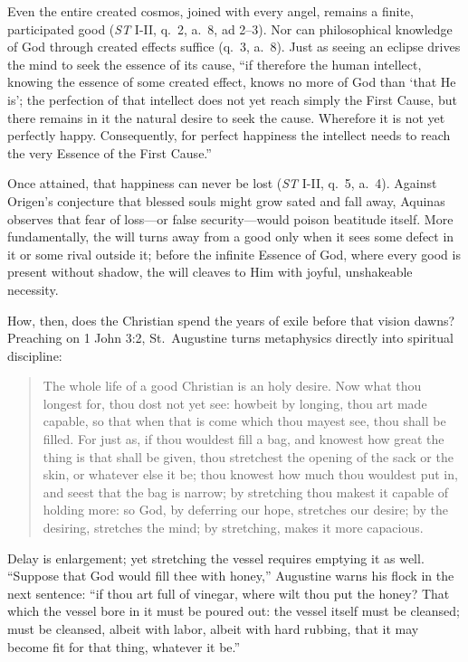 Even the entire created cosmos, joined with every angel, remains a finite, participated good (\textit{ST} I-II, q.\ 2, a.\ 8, ad 2--3). Nor can philosophical knowledge of God through created effects suffice (q.\ 3, a.\ 8). Just as seeing an eclipse drives the mind to seek the essence of its cause, ``if therefore the human intellect, knowing the essence of some created effect, knows no more of God than `that He is'; the perfection of that intellect does not yet reach simply the First Cause, but there remains in it the natural desire to seek the cause. Wherefore it is not yet perfectly happy. Consequently, for perfect happiness the intellect needs to reach the very Essence of the First Cause.''

Once attained, that happiness can never be lost (\textit{ST} I-II, q.\ 5, a.\ 4). Against Origen's conjecture that blessed souls might grow sated and fall away, Aquinas observes that fear of loss---or false security---would poison beatitude itself. More fundamentally, the will turns away from a good only when it sees some defect in it or some rival outside it; before the infinite Essence of God, where every good is present without shadow, the will cleaves to Him with joyful, unshakeable necessity.

How, then, does the Christian spend the years of exile before that vision dawns? Preaching on 1 John 3:2, St.\ Augustine turns metaphysics directly into spiritual discipline:

\begin{quote}
The whole life of a good Christian is an holy desire. Now what thou longest for, thou dost not yet see: howbeit by longing, thou art made capable, so that when that is come which thou mayest see, thou shall be filled. For just as, if thou wouldest fill a bag, and knowest how great the thing is that shall be given, thou stretchest the opening of the sack or the skin, or whatever else it be; thou knowest how much thou wouldest put in, and seest that the bag is narrow; by stretching thou makest it capable of holding more: so God, by deferring our hope, stretches our desire; by the desiring, stretches the mind; by stretching, makes it more capacious.
\end{quote}

Delay is enlargement; yet stretching the vessel requires emptying it as well. ``Suppose that God would fill thee with honey,'' Augustine warns his flock in the next sentence: ``if thou art full of vinegar, where wilt thou put the honey? That which the vessel bore in it must be poured out: the vessel itself must be cleansed; must be cleansed, albeit with labor, albeit with hard rubbing, that it may become fit for that thing, whatever it be.''

